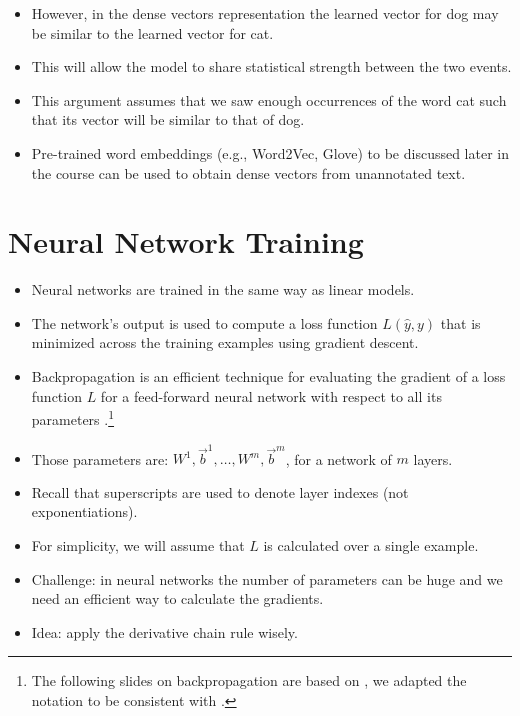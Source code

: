 \begin{itemize}
\item However, in the dense vectors representation the learned vector for dog may be similar to the learned vector for cat.

\item This will allow the model to share statistical strength between the two events. 

\item This argument assumes that we saw enough occurrences of the word cat such that its vector will be similar to that of dog.

\item Pre-trained word embeddings (e.g., Word2Vec, Glove) to be discussed later in the course can be used to obtain dense vectors from unannotated text.


\end{itemize}



\section{Neural Network Training}
\begin{itemize}
\item Neural networks are trained in the same way as linear models.

\item The network's output is used to compute a loss function $L(\hat{y},y)$ that is minimized across the training examples using gradient descent. 
\item Backpropagation is an efficient technique for evaluating the gradient
of a loss function $L$ for a feed-forward neural network with respect to all its parameters \cite{bishop2006pattern}.\footnote{The following slides on backpropagation are based on \cite{bishop2006pattern}, we adapted the notation to be consistent with \cite{goldberg2017neural}.}
\item Those parameters are: $W^1, \vec{b}^1, \dots, W^m, \vec{b}^m$, for a network of $m$ layers.
\item Recall that superscripts are used to denote layer indexes (not exponentiations).
\item For simplicity, we will assume that $L$ is calculated over a single example.
\item Challenge: in neural networks the number of parameters can be huge and we need an efficient way to calculate the gradients.

\item Idea: apply the derivative chain rule wisely.

\end{itemize}


